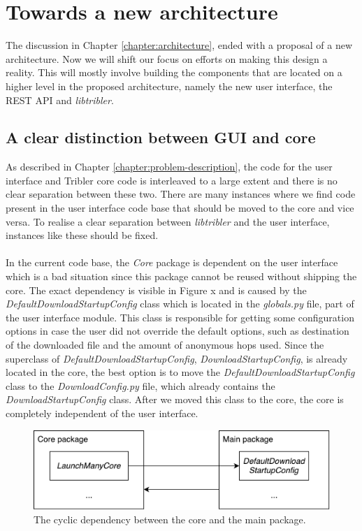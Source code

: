 \chapter{Towards a new architecture}
\label{chapter:towards_new_architecture}
The discussion in Chapter \ref{chapter:architecture}, ended with a proposal of a new architecture. Now we will shift our focus on efforts on making this design a reality. This will mostly involve building the components that are located on a higher level in the proposed architecture, namely the new user interface, the REST API and \emph{libtribler}.

\section{A clear distinction between GUI and core}
As described in Chapter \ref{chapter:problem-description}, the code for the user interface and Tribler core code is interleaved to a large extent and there is no clear separation between these two. There are many instances where we find code present in the user interface code base that should be moved to the core and vice versa. To realise a clear separation between \emph{libtribler} and the user interface, instances like these should be fixed.\\\\
In the current code base, the \emph{Core} package is dependent on the user interface which is a bad situation since this package cannot be reused without shipping the core. The exact dependency is visible in Figure x and is caused by the \emph{DefaultDownloadStartupConfig} class which is located in the \emph{globals.py} file, part of the user interface module. This class is responsible for getting some configuration options in case the user did not override the default options, such as destination of the downloaded file and the amount of anonymous hops used. Since the superclass of \emph{DefaultDownloadStartupConfig}, \emph{DownloadStartupConfig}, is already located in the core, the best option is to move the \emph{DefaultDownloadStartupConfig} class to the \emph{DownloadConfig.py} file, which already contains the \emph{DownloadStartupConfig} class. After we moved this class to the core, the core is completely independent of the user interface.

\begin{figure}[h!]
	\centering
	\includegraphics[width=0.6\columnwidth]{images/implementation/cycle_main_core}
	\caption{The cyclic dependency between the core and the main package.}
	\label{fig:cycle-main-core}
\end{figure}

